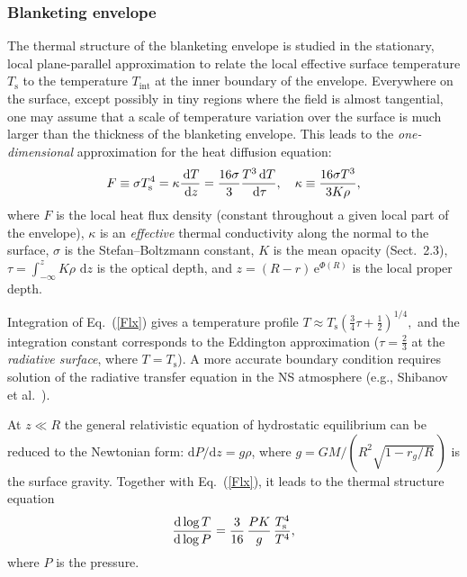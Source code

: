 \documentclass{aa}
\begin{document}
\subsubsection{Blanketing envelope}
\label{sect-blank}
%
The thermal structure of the blanketing envelope is studied
in the stationary, local plane-parallel approximation to relate the
local effective surface temperature $T_\mathrm{s}$
to the temperature $T_\mathrm{int}$ at the
inner boundary of the envelope. Everywhere on the surface,
except possibly in tiny regions
where the field is almost tangential,
one may assume that a scale of
temperature variation over the surface is much larger than the
thickness of the blanketing envelope.
This leads to the \emph{one-dimensional} approximation
for the heat diffusion equation:
%
\begin{equation}
 F \equiv \sigma T_\mathrm{s}^4 = \kappa {{\rm\,d}T\over{\rm\,d}z}=
      {16\sigma\over3}{T^3{\rm\,d}T\over{\rm\,d}\tau},
\quad
    \kappa\equiv{16\sigma T^3\over3K\rho},
\label{Flx}
\end{equation}      
%
where $F$ is the local heat flux density (constant throughout
a given local part of the envelope),
$\kappa$ is an \emph{effective} thermal conductivity
along the normal to the surface, $\sigma$ is
the Stefan--Boltzmann constant, 
$K$ is the mean opacity (Sect.\ 2.3),
       $\tau=\int_{-\infty}^z K\rho \, \,\mathrm{d} z$ is the
optical depth,
and
$z=(R-r)\,\mathrm{e}^{\Phi(R)}$ is the local proper depth.

Integration of Eq.~(\ref{Flx}) gives a temperature profile
$
 T \approx T_\mathrm{s} (\frac34\tau+\frac12)^{1/4},
$
and the integration constant corresponds to the Eddington 
approximation ($\tau=\frac23$ at the {\em radiative surface\/},
where $T=T_\mathrm{s}$).
A more accurate boundary condition 
requires solution of the radiative transfer equation in 
the NS atmosphere (e.g., Shibanov et al.\ \cite{shibetal98}).

At $z\ll R$
the general relativistic equation of hydrostatic equilibrium
can be reduced to the Newtonian form: $\mathrm{d} P/\mathrm{d} z=g\rho$,
where $g=GM/(R^2 \sqrt{1-r_g/R}\,)$ is the surface gravity.
Together with Eq.~(\ref{Flx}), it leads to the thermal structure equation
%
\begin{equation}
   {\mathrm{d}\log T\over\mathrm{d}\log P} =
   {3\over 16}\,{PK\over g}\,{T_\mathrm{s}^4\over T^4},
\label{th-str}
\end{equation}
%
where $P$ is the pressure.
\end{document}
